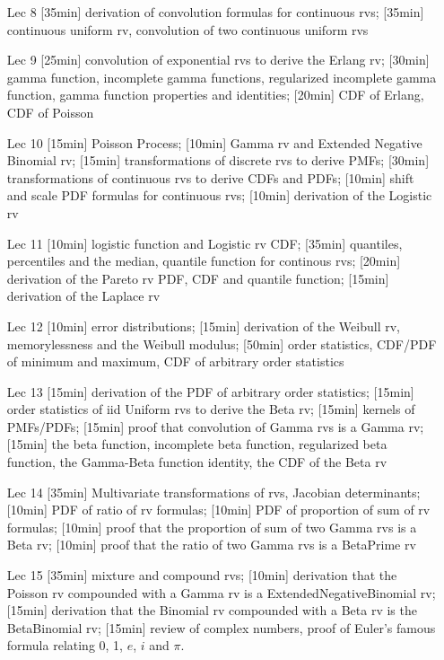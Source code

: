 \begin{enumerate}
\item[Lec 8] [35min] derivation of convolution formulas for continuous rvs; [35min] continuous uniform rv, convolution of two continuous uniform rvs

\item[Lec 9] [25min] convolution of exponential rvs to derive the Erlang rv; [30min] gamma function, incomplete gamma functions, regularized incomplete gamma function, gamma function properties and identities; [20min] CDF of Erlang, CDF of Poisson

\item[Lec 10] [15min] Poisson Process; [10min] Gamma rv and Extended Negative Binomial rv; [15min] transformations of discrete rvs to derive PMFs; [30min] transformations of continuous rvs to derive CDFs and PDFs; [10min] shift and scale PDF formulas for continuous rvs; [10min] derivation of the Logistic rv

\item[Lec 11] [10min] logistic function and Logistic rv CDF; [35min] quantiles, percentiles and the median, quantile function for continous rvs; [20min] derivation of the Pareto rv PDF, CDF and quantile function; [15min] derivation of the Laplace rv

\item[Lec 12] [10min] error distributions; [15min] derivation of the Weibull rv, memorylessness and the Weibull modulus; [50min] order statistics, CDF/PDF of minimum and maximum, CDF of arbitrary order statistics

\item[Lec 13] [15min] derivation of the PDF of arbitrary order statistics; [15min] order statistics of iid Uniform rvs to derive the Beta rv; [15min] kernels of PMFs/PDFs; [15min] proof that convolution of Gamma rvs is a Gamma rv; [15min] the beta function, incomplete beta function, regularized beta function, the Gamma-Beta function identity, the CDF of the Beta rv

\item[Lec 14] [35min] Multivariate transformations of rvs, Jacobian determinants; [10min] PDF of ratio of rv formulas; [10min] PDF of proportion of sum of rv formulas; [10min] proof that the proportion of sum of two Gamma rvs is a Beta rv; [10min] proof that the ratio of two Gamma rvs is a BetaPrime rv

\item[Lec 15] [35min] mixture and compound rvs; [10min] derivation that the Poisson rv compounded with a Gamma rv is a ExtendedNegativeBinomial rv; [15min] derivation that the Binomial rv compounded with a Beta rv is the BetaBinomial rv; [15min] review of complex numbers, proof of Euler's famous formula relating 0, 1, $e$, $i$ and $\pi$.


\end{enumerate}
